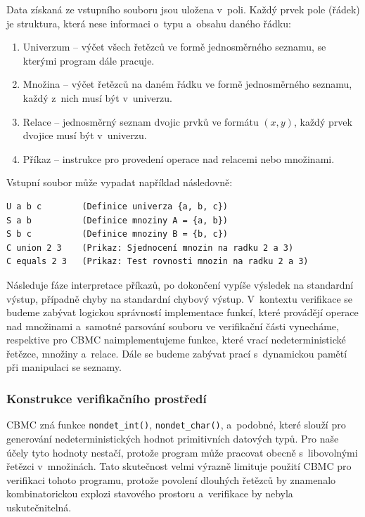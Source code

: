 \documentclass[a4paper, 11pt]{article}
\begin{document}
Data získaná ze vstupního souboru jsou uložena v~poli.
Každý prvek pole (řádek) je struktura, která nese informaci o~typu a~obsahu daného řádku:
\begin{enumerate}
    \item Univerzum -- výčet všech řetězců ve formě jednosměrného seznamu, se kterými program dále pracuje.
    \item Množina -- výčet řetězců na daném řádku ve formě jednosměrného seznamu, každý z~nich musí být v~univerzu.
    \item Relace -- jednosměrný seznam dvojic prvků ve formátu $(x, y)$, každý prvek dvojice musí být v~univerzu.
    \item Příkaz -- instrukce pro provedení operace nad relacemi nebo množinami.
\end{enumerate}
Vstupní soubor může vypadat například následovně:
\begin{lstlisting}
U a b c        (Definice univerza {a, b, c})
S a b          (Definice mnoziny A = {a, b})
S b c          (Definice mnoziny B = {b, c})
C union 2 3    (Prikaz: Sjednocení mnozin na radku 2 a 3)
C equals 2 3   (Prikaz: Test rovnosti mnozin na radku 2 a 3)
\end{lstlisting}

Následuje fáze interpretace příkazů, po dokončení vypíše výsledek na standardní výstup, případně chyby na standardní chybový výstup.
V~kontextu verifikace se budeme zabývat logickou správností implementace funkcí, které provádějí operace nad množinami a~samotné parsování souboru ve verifikační části vynecháme, respektive pro CBMC naimplementujeme funkce, které vrací nedeterministické řetězce, množiny a~relace.
Dále se budeme zabývat prací s~dynamickou pamětí při manipulaci se seznamy.

\subsubsection{Konstrukce verifikačního prostředí}
CBMC zná funkce \texttt{nondet\_int()}, \texttt{nondet\_char()}, a~podobné, které slouží pro generování nedeterministických hodnot primitivních datových typů.
Pro naše účely tyto hodnoty nestačí, protože program může pracovat obecně s~libovolnými řetězci v~množinách.
Tato skutečnost velmi výrazně limituje použití CBMC pro verifikaci tohoto programu, protože povolení dlouhých řetězců by znamenalo kombinatorickou explozi stavového prostoru a~verifikace by nebyla uskutečnitelná.
\end{document}
